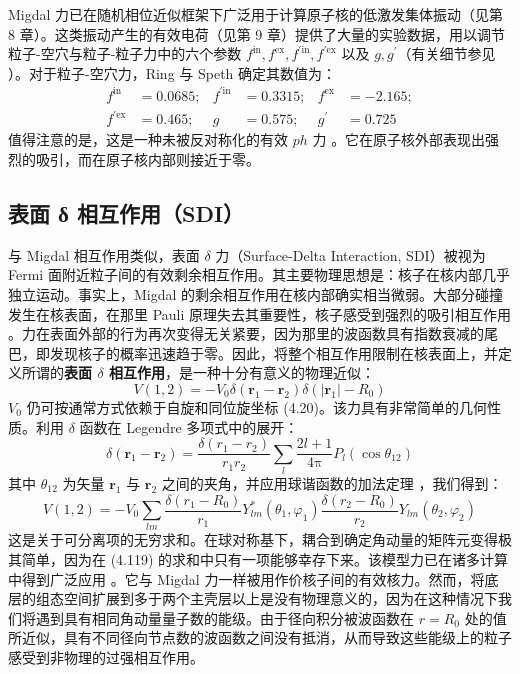 Migdal 力已在随机相位近似框架下广泛用于计算原子核的低激发集体振动（见第 8 章）。这类振动产生的有效电荷（见第 9 章）提供了大量的实验数据，用以调节粒子-空穴与粒子-粒子力中的六个参数
$f^{\text{in}},f^{\text{ex}},f^{\prime\text{in}},f^{\prime\text{ex}}$
以及 $g,g^{\prime}$（有关细节参见 \cite{RBS73,BSK73,BER75}）。对于粒子-空穴力，Ring
与 Speth \cite{RS74a} 确定其数值为：
\begin{align}
f^{\text{in}} & =0.0685; & f^{\prime\text{in}} & =0.3315; & f^{\text{ex}} & =-2.165;\nonumber \\
f^{\prime\text{ex}} & =0.465; & g & =0.575; & g^{\prime} & =0.725\label{eq:4.116}
\end{align}
值得注意的是，这是一种未被反对称化的有效 $ph$ 力 \cite{KMS76}。它在原子核外部表现出强烈的吸引，而在原子核内部则接近于零。

\subsection{表面 δ 相互作用（SDI）}

与 Migdal 相互作用类似，表面 $\delta$ 力（Surface-Delta Interaction, SDI）被视为
Fermi 面附近粒子间的有效剩余相互作用。其主要物理思想是：核子在核内部几乎独立运动。事实上，Migdal 的剩余相互作用在核内部确实相当微弱。大部分碰撞发生在核表面，在那里
Pauli 原理失去其重要性，核子感受到强烈的吸引相互作用 \cite{GM65}。力在表面外部的行为再次变得无关紧要，因为那里的波函数具有指数衰减的尾巴，即发现核子的概率迅速趋于零。因此，将整个相互作用限制在核表面上，并定义所谓的\textbf{表面
$\delta$ 相互作用}，是一种十分有意义的物理近似：
\begin{equation}
V(1,2)=-V_{0}\delta(\boldsymbol{r}_{1}-\boldsymbol{r}_{2})\delta(|\boldsymbol{r}_{1}|-R_{0})\label{eq:4.117}
\end{equation}
$V_{0}$ 仍可按通常方式依赖于自旋和同位旋坐标 (4.20)。该力具有非常简单的几何性质。利用 $\delta$ 函数在
Legendre 多项式中的展开：
\begin{equation}
\delta(\boldsymbol{r}_{1}-\boldsymbol{r}_{2})=\frac{\delta(r_{1}-r_{2})}{r_{1}r_{2}}\sum_{l}\frac{2l+1}{4\mathrm{\pi}}P_{l}(\cos\theta_{12})\label{eq:4.118}
\end{equation}
其中 $\theta_{12}$ 为矢量 $\boldsymbol{r}_{1}$ 与 $\boldsymbol{r}_{2}$
之间的夹角，并应用球谐函数的加法定理 \cite[式 4.6.6]{Ed57}，我们得到：
\begin{equation}
V(1,2)=-V_{0}\sum_{lm}\frac{\delta(r_{1}-R_{0})}{r_{1}}Y^{*}_{lm}(\theta_{1},\varphi_{1})\frac{\delta(r_{2}-R_{0})}{r_{2}}Y_{lm}(\theta_{2},\varphi_{2})\label{eq:4.119}
\end{equation}
这是关于可分离项的无穷求和。在球对称基下，耦合到确定角动量的矩阵元变得极其简单，因为在 (4.119) 的求和中只有一项能够幸存下来。该模型力已在诸多计算中得到广泛应用
\cite{KS63,PAM66,FP67,Fa68,VPK69}。它与 Migdal 力一样被用作价核子间的有效核力。然而，将底层的组态空间扩展到多于两个主壳层以上是没有物理意义的，因为在这种情况下我们将遇到具有相同角动量量子数的能级。由于径向积分被波函数在
$r=R_{0}$ 处的值所近似，具有不同径向节点数的波函数之间没有抵消，从而导致这些能级上的粒子感受到非物理的过强相互作用。

